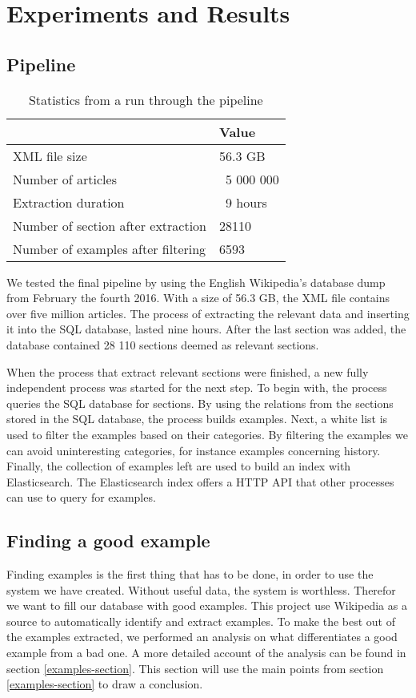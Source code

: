 
\chapter{Experiments and Results}

\section{Pipeline}
\begin{table}[h!]
\centering
\begin{tabular} {|| p{20em} | p{5em} ||} 
 \hline
  & Value \\ [0.5ex] 
 \hline
XML file size & 56.3 GB \\
Number of articles & ~5 000 000 \\
Extraction duration & ~9 hours \\
Number of section after extraction & 28110 \\
Number of examples after filtering & 6593 \\

 \hline
\end{tabular}
\caption{Statistics from a run through the pipeline}
\label{table:run_statistics}
\end{table}


We tested the final pipeline by using the English Wikipedia's database dump from February the fourth 2016. With a size of 56.3 GB, the XML file contains over five million articles. The process of extracting the relevant data and inserting it into the SQL database, lasted nine hours. After the last section was added, the database contained 28 110 sections deemed as relevant sections.

When the process that extract relevant sections were finished, a new fully independent process was started for the next step. To begin with, the process queries the SQL database for sections. By using the relations from the sections stored in the SQL database, the process builds examples. Next, a white list is used to filter the examples based on their categories. By filtering the examples we can avoid uninteresting categories, for instance examples concerning history. Finally, the collection of examples left are used to build an index with Elasticsearch. The Elasticsearch index offers a HTTP API that other processes can use to query for examples.


\section{Finding a good example}
Finding examples is the first thing that has to be done, in order to use the system we have created. Without useful data, the system is worthless. Therefor we want to fill our database with good examples. This project use Wikipedia as a source to automatically identify and extract examples. To make the best out of the examples extracted, we performed an analysis on what differentiates a good example from a bad one. A more detailed account of the analysis can be found in section \ref{examples-section}. This section will use the main points from section \ref{examples-section} to draw a conclusion.

